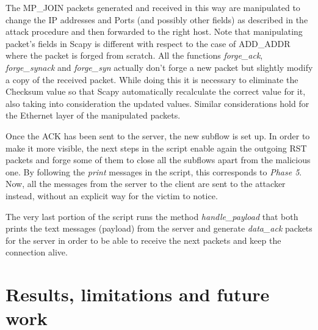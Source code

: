 The MP\_JOIN packets generated and received in this way are manipulated to change the IP addresses and Ports (and possibly other fields) as described in the attack procedure and then forwarded to the right host. Note that manipulating packet's fields in Scapy is different with respect to the case of ADD\_ADDR where the packet is forged from scratch. All the functions \textit{forge\_ack}, \textit{forge\_synack} and \textit{forge\_syn} actually don't forge a new packet but slightly modify a copy of the received packet. While doing this it is necessary to eliminate the Checksum value so that Scapy automatically recalculate the correct value for it, also taking into consideration the updated values. Similar considerations hold for the Ethernet layer of the manipulated packets. 

Once the ACK has been sent to the server, the new subflow is set up. In order to make it more visible, the next steps in the script enable again the outgoing RST packets and forge some of them to close all the subflows apart from the malicious one. By following the \textit{print} messages in the script, this corresponds to \textit{Phase 5}. Now, all the messages from the server to the client are sent to the attacker instead, without an explicit way for the victim to notice. 

The very last portion of the script runs the method \textit{handle\_payload} that both prints the text messages (payload) from the server and generate \textit{data\_ack} packets for the server in order to be able to receive the next packets and keep the connection alive. 

\section{Results, limitations and future work} \label{limitationsandfuturework}

